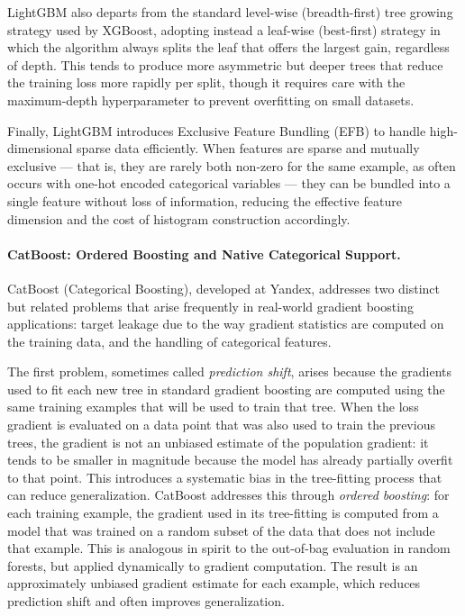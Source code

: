 LightGBM also departs from the standard level-wise (breadth-first) tree growing strategy used by XGBoost, adopting instead a leaf-wise (best-first) strategy in which the algorithm always splits the leaf that offers the largest gain, regardless of depth. This tends to produce more asymmetric but deeper trees that reduce the training loss more rapidly per split, though it requires care with the maximum-depth hyperparameter to prevent overfitting on small datasets.

Finally, LightGBM introduces Exclusive Feature Bundling (EFB) to handle high-dimensional sparse data efficiently. When features are sparse and mutually exclusive --- that is, they are rarely both non-zero for the same example, as often occurs with one-hot encoded categorical variables --- they can be bundled into a single feature without loss of information, reducing the effective feature dimension and the cost of histogram construction accordingly.

\paragraph{CatBoost: Ordered Boosting and Native Categorical Support.}
CatBoost (Categorical Boosting), developed at Yandex, addresses two distinct but related problems that arise frequently in real-world gradient boosting applications: target leakage due to the way gradient statistics are computed on the training data, and the handling of categorical features.

The first problem, sometimes called \emph{prediction shift}, arises because the gradients used to fit each new tree in standard gradient boosting are computed using the same training examples that will be used to train that tree. When the loss gradient is evaluated on a data point that was also used to train the previous trees, the gradient is not an unbiased estimate of the population gradient: it tends to be smaller in magnitude because the model has already partially overfit to that point. This introduces a systematic bias in the tree-fitting process that can reduce generalization. CatBoost addresses this through \emph{ordered boosting}: for each training example, the gradient used in its tree-fitting is computed from a model that was trained on a random subset of the data that does not include that example. This is analogous in spirit to the out-of-bag evaluation in random forests, but applied dynamically to gradient computation. The result is an approximately unbiased gradient estimate for each example, which reduces prediction shift and often improves generalization.

